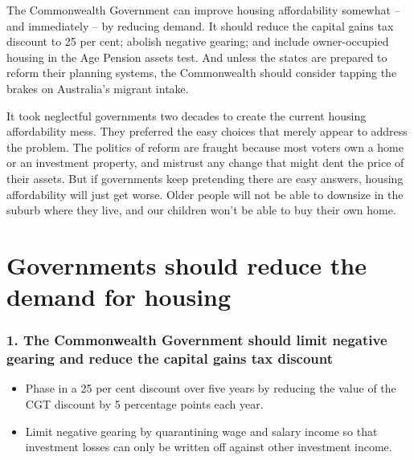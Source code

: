 \documentclass[FrontPage]{grattan}
\begin{document}
\begin{overview}
The Commonwealth Government can improve housing affordability somewhat – and immediately – by reducing demand.
It should reduce the capital gains tax discount to 25 per cent; abolish negative gearing; and include owner-occupied housing in the Age Pension assets test.
And unless the states are prepared to reform their planning systems, the Commonwealth should consider tapping the brakes on Australia’s migrant intake.

It took neglectful governments two decades to create the current housing affordability mess.
They preferred the easy choices that merely appear to address the problem.
The politics of reform are fraught because most voters own a home or an investment property, and mistrust any change that might dent the price of their assets.
But if governments keep pretending there are easy answers, housing affordability will just get worse.
Older people will not be able to downsize in the suburb where they live, and our children won’t be able to buy their own home. 
 
 

\end{overview}

\label{chap:recommendations}
\raggedbottom

\section*{Governments should reduce the demand for housing}

\subsubsection{1. The Commonwealth Government should limit negative gearing and reduce the capital gains tax discount}
\begin{itemize}
\item  Phase in a 25 per cent discount over five years by reducing the value of the CGT discount by 5 percentage points each year.
\item Limit negative gearing by quarantining wage and salary income so that investment losses can only be written off against other investment income.
\end{itemize}
\end{document}
